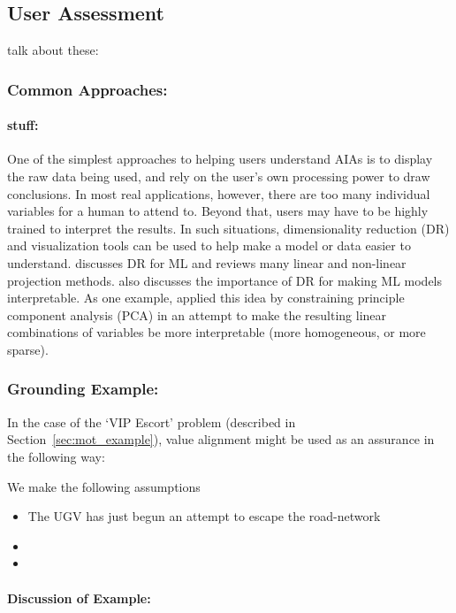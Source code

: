 \subsection{User Assessment} \label{sec:user_assessment}
talk about these: \citet{Yu2018-qw, Wickens1999-la, Riley1996-qm, Muir1996-gt, Desai2012-rc}

\subsubsection{Common Approaches:}

\paragraph{stuff:}
One of the simplest approaches to helping users understand AIAs is to display the raw data being used, and rely on the user's own processing power to draw conclusions. In most real applications, however, there are too many individual variables for a human to attend to. Beyond that, users may have to be highly trained to interpret the results. In such situations, dimensionality reduction (DR) and visualization tools can be used to help make a model or data easier to understand. \citet{Venna2007-yj} discusses DR for ML and reviews many linear and non-linear projection methods. \citet{Vellido2012-nm} also discusses the importance of DR for making ML models interpretable. As one example, \citet{Chipman2005-om} applied this idea by constraining principle component analysis (PCA) in an attempt to make the resulting linear combinations of variables be more interpretable (more homogeneous, or more sparse).


\subsubsection{Grounding Example:}
In the case of the `VIP Escort' problem (described in Section~\ref{sec:mot_example}), value alignment might be used as an assurance in the following way:

We make the following assumptions

\begin{itemize}
    \item The UGV has just begun an attempt to escape the road-network
    \item 
    \item 
\end{itemize}

\paragraph{\textbf{Discussion of Example:}} 
